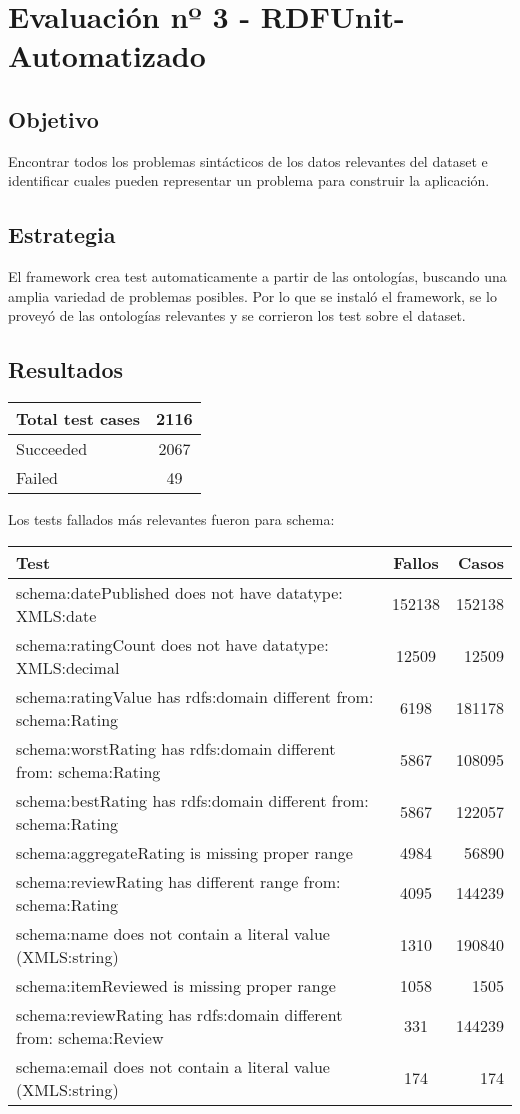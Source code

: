 \section{Evaluación nº 3 - RDFUnit-Automatizado}
\label{section:evaluacion-automatizado}

\subsection*{Objetivo}
Encontrar todos los problemas sintácticos de los datos relevantes del dataset e identificar cuales pueden representar un problema 
para construir la aplicación.

\subsection*{Estrategia}
El framework crea test automaticamente a partir de las ontologías, buscando una amplia variedad de problemas posibles. Por lo que se 
instaló el framework, se lo proveyó de las ontologías relevantes y se corrieron los test sobre el dataset.

\subsection*{Resultados}

\begin{tabular}{| l | c | }\hline
Total test cases & 2116\\\hline
Succeeded & 2067\\
Failed & 49\\\hline
\end{tabular}

Los tests fallados más relevantes fueron para schema:

\begin{tabular}{| l | c | r | }\hline
Test & Fallos & Casos \\\hline
schema:datePublished does not have datatype: XMLS:date & 152138 & 152138\\
schema:ratingCount does not have datatype: XMLS:decimal & 12509 & 12509\\
schema:ratingValue has rdfs:domain different from: schema:Rating & 6198	 & 181178\\
schema:worstRating has rdfs:domain different from: schema:Rating & 5867 & 108095\\
schema:bestRating has rdfs:domain different from: schema:Rating & 5867 & 122057\\
schema:aggregateRating is missing proper range & 4984 & 56890\\
schema:reviewRating has different range from: schema:Rating & 4095 & 144239\\
schema:name does not contain a literal value (XMLS:string) & 1310 & 190840\\
schema:itemReviewed is missing proper range & 1058 & 1505\\
schema:reviewRating has rdfs:domain different from: schema:Review & 331	 & 144239\\
schema:email does not contain a literal value (XMLS:string) & 174 & 174 \hline
\end{tabular}

